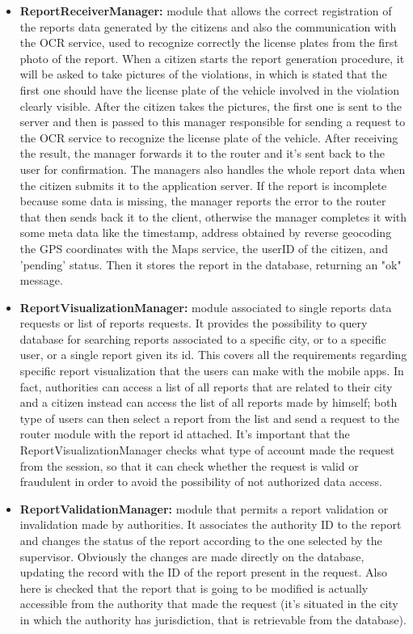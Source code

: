 \begin{itemize}
	\item \textbf{ReportReceiverManager:}
	module that allows the correct registration of the reports data generated by the citizens and also the communication with the OCR service, used to recognize correctly the license plates from the first photo of the report. When a citizen starts the report generation procedure, it will be asked to take pictures of the violations, in which is stated that the first one should have the license plate of the vehicle involved in the violation clearly visible. After the citizen takes the pictures, the first one is sent to the server and then is passed to this manager responsible for sending a request to the OCR service to recognize the license plate of the vehicle. After receiving the result, the manager forwards it to the router and it's sent back to the user for confirmation. The managers also handles the whole report data when the citizen submits it to the application server. If the report is incomplete because some data is missing, the manager reports the error to the router that then sends back it to the client, otherwise the manager completes it with some meta data like the timestamp, address obtained by reverse geocoding the GPS coordinates with the Maps service, the userID of the citizen, and 'pending' status. Then it stores the report in the database, returning an "ok" message.
	\item \textbf{ReportVisualizationManager:}
	module associated to single reports data requests or list of reports requests. It provides the possibility to query database for searching reports associated to a specific city, or to a specific user, or a single report given its id. This covers all the requirements regarding specific report visualization that the users can make with the mobile apps. In fact, authorities can access a list of all reports that are related to their city and a citizen instead can access the list of all reports made by himself; both type of users can then select a report from the list and send a request to the router module with the report id attached. It's important that the ReportVisualizationManager checks what type of account made the request from the session, so that it can check whether the request is valid or fraudulent in order to avoid the possibility of not authorized data access. 
	\item \textbf{ReportValidationManager:}
	module that permits a report validation or invalidation made by authorities. It associates the authority ID to the report and changes the status of the report according to the one selected by the supervisor. Obviously the changes are made directly on the database, updating the record with the ID of the report present in the request. Also here is checked that the report that is going to be modified is actually accessible from the authority that made the request (it's situated in the city in which the authority has jurisdiction, that is retrievable from the database).

\end{itemize}
